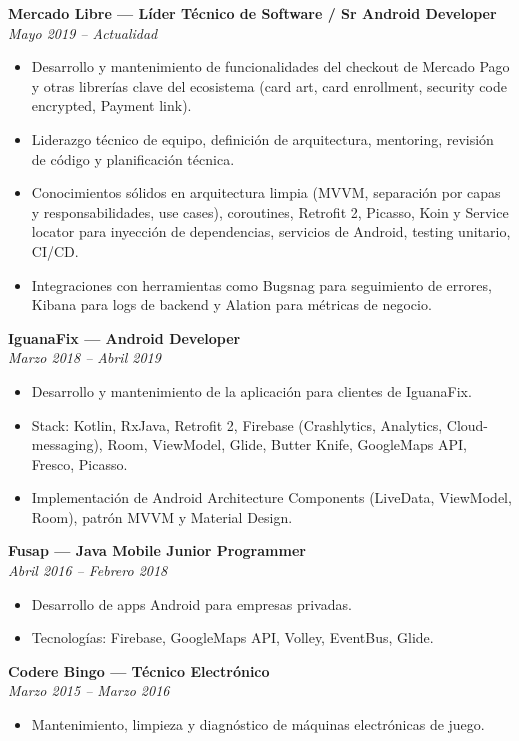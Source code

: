 \documentclass[11pt,a4paper]{article}
\newcommand{\jobtitle}[2]{
    \noindent\textbf{#1}\\
    \textit{#2}\par\vspace{0.5em}
}
\begin{document}
\jobtitle{Mercado Libre — Líder Técnico de Software / Sr Android Developer}{Mayo 2019 – Actualidad}
\begin{itemize}[leftmargin=*]
    \item Desarrollo y mantenimiento de funcionalidades del checkout de Mercado Pago y otras librerías clave del ecosistema (card art, card enrollment, security code encrypted, Payment link).
    \item Liderazgo técnico de equipo, definición de arquitectura, mentoring, revisión de código y planificación técnica.
    \item Conocimientos sólidos en arquitectura limpia (MVVM, separación por capas y responsabilidades, use cases), coroutines, Retrofit 2, Picasso, Koin y Service locator para inyección de dependencias, servicios de Android, testing unitario, CI/CD.
    \item Integraciones con herramientas como Bugsnag para seguimiento de errores, Kibana para logs de backend y Alation para métricas de negocio.
\end{itemize}

\jobtitle{IguanaFix — Android Developer}{Marzo 2018 – Abril 2019}
\begin{itemize}[leftmargin=*]
    \item Desarrollo y mantenimiento de la aplicación para clientes de IguanaFix.
    \item Stack: Kotlin, RxJava, Retrofit 2, Firebase (Crashlytics, Analytics, Cloud-messaging), Room, ViewModel, Glide, Butter Knife, GoogleMaps API, Fresco, Picasso.
    \item Implementación de Android Architecture Components (LiveData, ViewModel, Room), patrón MVVM y Material Design.
\end{itemize}

\jobtitle{Fusap — Java Mobile Junior Programmer}{Abril 2016 – Febrero 2018}
\begin{itemize}[leftmargin=*]
    \item Desarrollo de apps Android para empresas privadas.
    \item Tecnologías: Firebase, GoogleMaps API, Volley, EventBus, Glide.
\end{itemize}

\jobtitle{Codere Bingo — Técnico Electrónico}{Marzo 2015 – Marzo 2016}
\begin{itemize}[leftmargin=*]
    \item Mantenimiento, limpieza y diagnóstico de máquinas electrónicas de juego.
\end{itemize}
\end{document}
